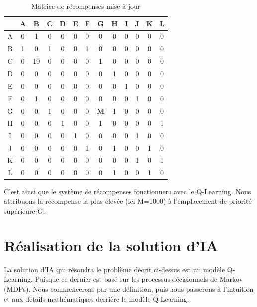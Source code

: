 \documentclass{article}
\begin{document}
\begin{table}[H]
    \centering
    \begin{tabular}{|c|c|c|c|c|c|c|c|c|c|c|c|c|}
        \hline
        & A & B & C & D & E & F & G & H & I & J & K & L \\
        \hline
        A & 0 & 1 & 0 & 0 & 0 & 0 & 0 & 0 & 0 & 0 & 0 & 0 \\
        B & 1 & 0 & 1 & 0 & 0 & 1 & 0 & 0 & 0 & 0 & 0 & 0 \\
        C & 0 & 10 & 0 & 0 & 0 & 0 & 1 & 0 & 0 & 0 & 0 & 0 \\
        D & 0 & 0 & 0 & 0 & 0 & 0 & 0 & 1 & 0 & 0 & 0 & 0 \\
        E & 0 & 0 & 0 & 0 & 0 & 0 & 0 & 0 & 1 & 0 & 0 & 0 \\
        F & 0 & 1 & 0 & 0 & 0 & 0 & 0 & 0 & 0 & 1 & 0 & 0 \\
        G & 0 & 0 & 1 & 0 & 0 & 0 & \textbf{M} & 1 & 0 & 0 & 0 & 0 \\
        H & 0 & 0 & 0 & 1 & 0 & 0 & 1 & 0 & 0 & 0 & 0 & 1 \\
        I & 0 & 0 & 0 & 0 & 1 & 0 & 0 & 0 & 0 & 1 & 0 & 0 \\
        J & 0 & 0 & 0 & 0 & 0 & 1 & 0 & 1 & 0 & 0 & 1 & 0 \\
        K & 0 & 0 & 0 & 0 & 0 & 0 & 0 & 0 & 0 & 1 & 0 & 1 \\
        L & 0 & 0 & 0 & 0 & 0 & 0 & 0 & 1 & 0 & 0 & 1 & 0 \\
        \hline
    \end{tabular}
    \caption{Matrice de récompenses mise à jour}
\end{table}
C'est ainsi que le système de récompenses fonctionnera avec le Q-Learning. Nous attribuons la récompense la plus élevée (ici M=1000) à l'emplacement de priorité supérieure G. 

\section{Réalisation de la solution d'IA}
La solution d'IA qui résoudra le problème décrit ci-dessus est un modèle Q-Learning. Puisque ce dernier est basé sur les processus décisionnels de Markov (MDPs). Nous commencerons par une définition, puis nous passerons à l'intuition et aux détails mathématiques derrière le modèle Q-Learning.
\end{document}
